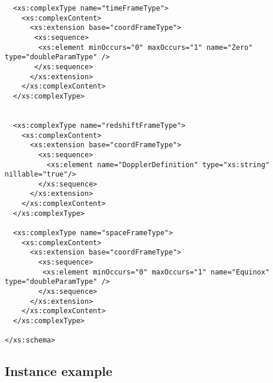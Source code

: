 {\begin{flushleft}
\begin{fmppage}
\begin{verbatim}
  <xs:complexType name="timeFrameType">
    <xs:complexContent>
      <xs:extension base="coordFrameType">
       <xs:sequence>
        <xs:element minOccurs="0" maxOccurs="1" name="Zero" type="doubleParamType" />
       </xs:sequence>
      </xs:extension>
    </xs:complexContent>
  </xs:complexType>


  <xs:complexType name="redshiftFrameType">
    <xs:complexContent>
      <xs:extension base="coordFrameType">
        <xs:sequence>
          <xs:element name="DopplerDefinition" type="xs:string" nillable="true"/>
        </xs:sequence>
      </xs:extension>
    </xs:complexContent>
  </xs:complexType>

  <xs:complexType name="spaceFrameType">
    <xs:complexContent>
      <xs:extension base="coordFrameType">
        <xs:sequence>
         <xs:element minOccurs="0" maxOccurs="1" name="Equinox" type="doubleParamType" />
        </xs:sequence>
      </xs:extension>
    </xs:complexContent>
  </xs:complexType>

</xs:schema>

\end{verbatim}
\end{fmppage}
\end{flushleft}
}



\subsection{Instance example}





